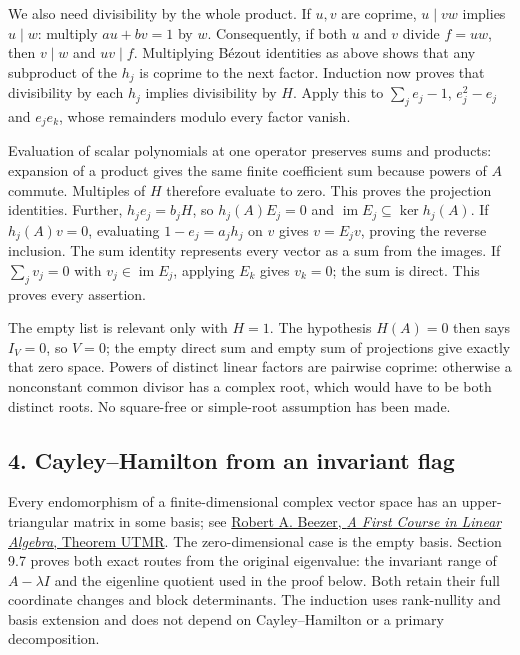\documentclass[
  11pt,
]{article}
\begin{document}
We also need divisibility by the whole product. If \(u,v\) are coprime,
\(u\mid vw\) implies \(u\mid w\): multiply \(au+bv=1\) by \(w\).
Consequently, if both \(u\) and \(v\) divide \(f=uw\), then \(v\mid w\)
and \(uv\mid f\). Multiplying Bézout identities as above shows that any
subproduct of the \(h_j\) is coprime to the next factor. Induction now
proves that divisibility by each \(h_j\) implies divisibility by \(H\).
Apply this to \(\sum_j e_j-1\), \(e_j^2-e_j\) and \(e_je_k\), whose
remainders modulo every factor vanish.

Evaluation of scalar polynomials at one operator preserves sums and
products: expansion of a product gives the same finite coefficient sum
because powers of \(A\) commute. Multiples of \(H\) therefore evaluate
to zero. This proves the projection identities. Further,
\(h_je_j=b_jH\), so \(h_j(A)E_j=0\) and
\(\operatorname{im}E_j\subseteq\ker h_j(A)\). If \(h_j(A)v=0\),
evaluating \(1-e_j=a_jh_j\) on \(v\) gives \(v=E_jv\), proving the
reverse inclusion. The sum identity represents every vector as a sum
from the images. If \(\sum_jv_j=0\) with \(v_j\in\operatorname{im}E_j\),
applying \(E_k\) gives \(v_k=0\); the sum is direct. This proves every
assertion.

The empty list is relevant only with \(H=1\). The hypothesis \(H(A)=0\)
then says \(I_V=0\), so \(V=0\); the empty direct sum and empty sum of
projections give exactly that zero space. Powers of distinct linear
factors are pairwise coprime: otherwise a nonconstant common divisor has
a complex root, which would have to be both distinct roots. No
square-free or simple-root assumption has been made.

\subsection{4. Cayley--Hamilton from an invariant
flag}\label{cayleyhamilton-from-an-invariant-flag}

Every endomorphism of a finite-dimensional complex vector space has an
upper-triangular matrix in some basis; see
\href{https://github.com/rbeezer/fcla/blob/347f27fe909b54b26970bcc0fcbf69c7e853c766/src/section-OD.xml\#L108-L201}{Robert
A. Beezer, \emph{A First Course in Linear Algebra}, Theorem UTMR}. The
zero-dimensional case is the empty basis. Section 9.7 proves both exact
routes from the original eigenvalue: the invariant range of
\(A-\lambda I\) and the eigenline quotient used in the proof below. Both
retain their full coordinate changes and block determinants. The
induction uses rank-nullity and basis extension and does not depend on
Cayley--Hamilton or a primary decomposition.
\end{document}
